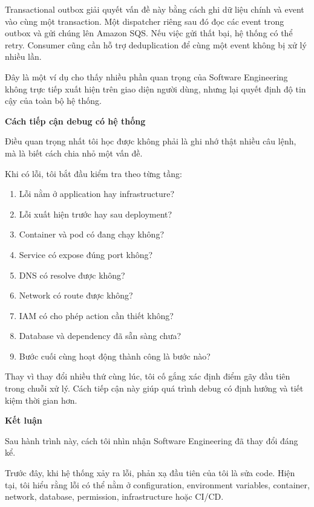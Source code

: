 Transactional outbox giải quyết vấn đề này bằng cách ghi dữ liệu chính
và event vào cùng một transaction. Một dispatcher riêng sau đó đọc các
event trong outbox và gửi chúng lên Amazon SQS. Nếu việc gửi thất bại,
hệ thống có thể retry. Consumer cũng cần hỗ trợ deduplication để cùng
một event không bị xử lý nhiều lần.

Đây là một ví dụ cho thấy nhiều phần quan trọng của Software Engineering
không trực tiếp xuất hiện trên giao diện người dùng, nhưng lại quyết
định độ tin cậy của toàn bộ hệ thống.

\vspace{0.5em}\noindent\textbf{Cách tiếp cận debug có hệ
thống}\par

Điều quan trọng nhất tôi học được không phải là ghi nhớ thật nhiều câu
lệnh, mà là biết cách chia nhỏ một vấn đề.

Khi có lỗi, tôi bắt đầu kiểm tra theo từng tầng:

\begin{enumerate}
\def\labelenumi{\arabic{enumi}.}
\tightlist
\item
  Lỗi nằm ở application hay infrastructure?
\item
  Lỗi xuất hiện trước hay sau deployment?
\item
  Container và pod có đang chạy không?
\item
  Service có expose đúng port không?
\item
  DNS có resolve được không?
\item
  Network có route được không?
\item
  IAM có cho phép action cần thiết không?
\item
  Database và dependency đã sẵn sàng chưa?
\item
  Bước cuối cùng hoạt động thành công là bước nào?
\end{enumerate}

Thay vì thay đổi nhiều thứ cùng lúc, tôi cố gắng xác định điểm gãy đầu
tiên trong chuỗi xử lý. Cách tiếp cận này giúp quá trình debug có định
hướng và tiết kiệm thời gian hơn.

\vspace{0.5em}\noindent\textbf{Kết luận}\par

Sau hành trình này, cách tôi nhìn nhận Software Engineering đã thay đổi
đáng kể.

Trước đây, khi hệ thống xảy ra lỗi, phản xạ đầu tiên của tôi là sửa
code. Hiện tại, tôi hiểu rằng lỗi có thể nằm ở configuration,
environment variables, container, network, database, permission,
infrastructure hoặc CI/CD.

